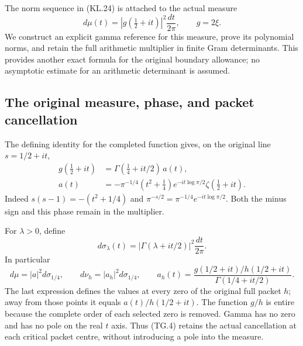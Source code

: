 \documentclass[11pt,a4paper]{article}
\begin{document}
The norm sequence in (KL.24) is attached to the actual measure
\[
 d\mu(t)=|g(\tfrac12+it)|^2\frac{dt}{2\pi},\qquad g=2\xi.
                                                               \tag{TG.1}
\]
We construct an explicit gamma reference for this measure, prove its
polynomial norms, and retain the full arithmetic multiplier in finite
Gram determinants.  This provides another exact formula for the
original boundary allowance; no asymptotic estimate for an arithmetic
determinant is assumed.

\subsection{The original measure, phase, and packet cancellation}

The defining identity for the completed function gives, on the original
line \(s=1/2+it\),
\[
 \begin{aligned}
 g(\tfrac12+it)&=\Gamma(\tfrac14+it/2)\,a(t),\\
 a(t)&=-\pi^{-1/4}(t^2+\tfrac14)
           e^{-it\log\pi/2}\zeta(\tfrac12+it).
 \end{aligned}                                                   \tag{TG.2}
\]
Indeed \(s(s-1)=-(t^2+1/4)\) and
\(\pi^{-s/2}=\pi^{-1/4}e^{-it\log\pi/2}\).  Both the minus
sign and this phase remain in the multiplier.

For \(\lambda>0\), define
\[
 d\sigma_\lambda(t)=|\Gamma(\lambda+it/2)|^2\frac{dt}{2\pi}.
                                                               \tag{TG.3}
\]
In particular
\[
 d\mu=|a|^2d\sigma_{1/4},\qquad
 d\nu_h=|a_h|^2d\sigma_{1/4},\qquad
 a_h(t)=\frac{g(1/2+it)/h(1/2+it)}{\Gamma(1/4+it/2)}.
                                                               \tag{TG.4}
\]
The last expression defines the values at every zero of the original
full packet \(h\); away from those points it equals
\(a(t)/h(1/2+it)\).  The function \(g/h\) is entire because
the complete order of each selected zero is removed.  Gamma has no
zero and has no pole on the real \(t\) axis.  Thus (TG.4) retains
the actual cancellation at each critical packet centre, without
introducing a pole into the measure.
\end{document}
